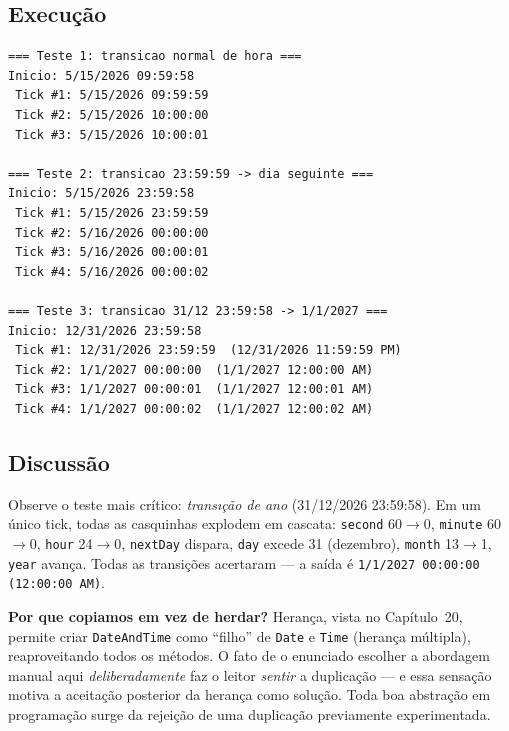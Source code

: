 \documentclass[11pt,a4paper]{article}
\begin{document}


\subsection*{Execu\c{c}\~ao}

\begin{saidabox}
\begin{lstlisting}[style=terminal]
=== Teste 1: transicao normal de hora ===
Inicio: 5/15/2026 09:59:58
 Tick #1: 5/15/2026 09:59:59
 Tick #2: 5/15/2026 10:00:00
 Tick #3: 5/15/2026 10:00:01

=== Teste 2: transicao 23:59:59 -> dia seguinte ===
Inicio: 5/15/2026 23:59:58
 Tick #1: 5/15/2026 23:59:59
 Tick #2: 5/16/2026 00:00:00
 Tick #3: 5/16/2026 00:00:01
 Tick #4: 5/16/2026 00:00:02

=== Teste 3: transicao 31/12 23:59:58 -> 1/1/2027 ===
Inicio: 12/31/2026 23:59:58
 Tick #1: 12/31/2026 23:59:59  (12/31/2026 11:59:59 PM)
 Tick #2: 1/1/2027 00:00:00  (1/1/2027 12:00:00 AM)
 Tick #3: 1/1/2027 00:00:01  (1/1/2027 12:00:01 AM)
 Tick #4: 1/1/2027 00:00:02  (1/1/2027 12:00:02 AM)
\end{lstlisting}
\end{saidabox}

\subsection*{Discuss\~ao}

Observe o teste mais cr\'itico: \emph{trans\i\c{c}\~ao de ano} (31/12/2026 23:59:58). Em um \'unico tick, todas as casquinhas explodem em cascata: \texttt{second} 60$\to$0, \texttt{minute} 60$\to$0, \texttt{hour} 24$\to$0, \texttt{nextDay} dispara, \texttt{day} excede 31 (dezembro), \texttt{month} 13$\to$1, \texttt{year} avan\c{c}a. Todas as transi\c{c}\~oes acertaram --- a sa\'ida \'e \texttt{1/1/2027 00:00:00 (12:00:00 AM)}.

\begin{obseng}
\textbf{Por que copiamos em vez de herdar?} Heran\c{c}a, vista no Cap\'itulo~20, permite criar \texttt{DateAndTime} como ``filho'' de \texttt{Date} e \texttt{Time} (heran\c{c}a m\'ultipla), reaproveitando todos os m\'etodos. O fato de o enunciado escolher a abordagem manual aqui \emph{deliberadamente} faz o leitor \emph{sentir} a duplica\c{c}\~ao --- e essa sensa\c{c}\~ao motiva a aceita\c{c}\~ao posterior da heran\c{c}a como solu\c{c}\~ao. Toda boa abstra\c{c}\~ao em programa\c{c}\~ao surge da rejei\c{c}\~ao de uma duplica\c{c}\~ao previamente experimentada.
\end{obseng}
\end{document}
